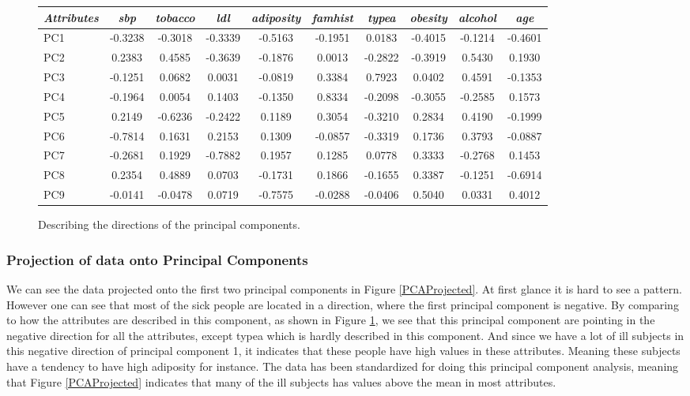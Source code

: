 \begin{figure}[H]
\begin{longtable}{ l c c c c c c c c c}
 \hline
 \emph{Attributes} &  \emph{sbp} &  \emph{tobacco} &  \emph{ldl} & \emph{adiposity} &  \emph{famhist} &  \emph{typea} &  \emph{obesity} &  \emph{alcohol} &  \emph{age} \\ \hline
PC1 & -0.3238 & -0.3018 &  -0.3339 &  -0.5163 & -0.1951 & 0.0183 & -0.4015 & -0.1214 & -0.4601 \\ 
PC2 & 0.2383 &  0.4585 & -0.3639 &  -0.1876 &  0.0013 &   -0.2822 & -0.3919 & 0.5430 & 0.1930 \\ 
PC3 & -0.1251 & 0.0682 &  0.0031 & -0.0819 &  0.3384 & 0.7923 & 0.0402 &  0.4591 & -0.1353 \\ 
PC4 & -0.1964 & 0.0054 & 0.1403 & -0.1350 &  0.8334 & -0.2098 & -0.3055 & -0.2585 &  0.1573 \\ 
PC5 & 0.2149 & -0.6236 & -0.2422 &  0.1189 &  0.3054 & -0.3210 & 0.2834 &  0.4190 &  -0.1999 \\ 
PC6 & -0.7814 &  0.1631 &   0.2153 &  0.1309 & -0.0857 & -0.3319 & 0.1736 & 0.3793 & -0.0887 \\ 
PC7 & -0.2681 &  0.1929 & -0.7882 &  0.1957 &  0.1285 &  0.0778 & 0.3333 & -0.2768 &  0.1453 \\ 
PC8 & 0.2354 &  0.4889 &  0.0703 & -0.1731 & 0.1866 & -0.1655 &   0.3387 & -0.1251 & -0.6914 \\ 
PC9 & -0.0141 & -0.0478 & 0.0719 & -0.7575 & -0.0288 & -0.0406 & 0.5040 & 0.0331 & 0.4012 \\ \hline  
\end{longtable}
\caption{Describing the directions of the principal components.}
\label{PCADirections}
\end{figure}

\subsubsection{Projection of data onto Principal Components}

We can see the data projected onto the first two principal components in Figure \ref{PCAProjected}. At first glance it is hard to see a pattern. However one can see that most of the sick people are located in a direction, where the first principal component is negative. By comparing to how the attributes are described in this component, as shown in Figure \ref{PCADirections}, we see that this principal component are pointing in the negative direction for all the attributes, except typea which is hardly described in this component. And since we have a lot of ill subjects in this negative direction of principal component 1, it indicates that these people have high values in these attributes. Meaning these subjects have a tendency to have high adiposity for instance. The data has been standardized for doing this principal component analysis, meaning that Figure \ref{PCAProjected} indicates that many of the ill subjects has values above the mean in most attributes.

